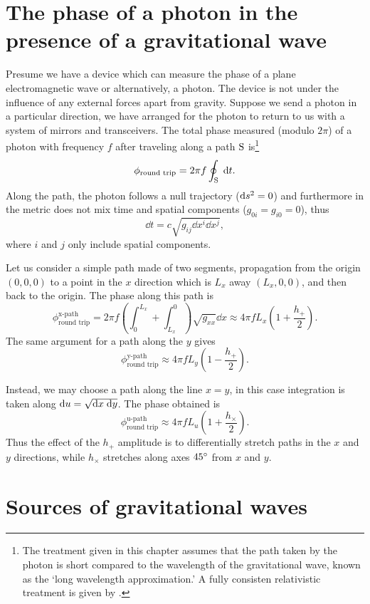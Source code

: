 \section{The phase of a photon in the presence of a gravitational wave}
Presume we have a device which can measure the phase of a plane electromagnetic wave or alternatively, a photon. %
The device is not under the influence of any external forces apart from gravity. %
Suppose we send a photon in a particular direction, we have arranged for the photon to return to us with a system of mirrors and transceivers. %
The total phase measured (modulo $2\pi$) of a photon with frequency $f$ after traveling along a path $\rm S$ is\footnote{The treatment given in this chapter assumes that the path taken by the photon is short compared to the wavelength of the gravitational wave, known as the `long wavelength approximation.' A fully consisten relativistic treatment is given by \citet{RakhmanovPhoton}.}
\begin{equation}
\phi_{\text{round trip}} = 2\pi f\oint_{\rm S} \; \mathrm{d} t.
\end{equation}
Along the path, the photon follows a null trajectory ($\mathrm{d} s^2=0$) and furthermore in  the metric does not mix time and spatial components ($g_{0i}=g_{i0}=0$), thus
\begin{equation}
\dd t = c\sqrt{g_{ij}\dd x^i \dd x^j},
\end{equation}
where $i$ and $j$ only include spatial components.

Let us consider a simple path made of two segments, propagation from the origin $(0,0,0)$ to a point in the $x$ direction which is $L_x$ away $(L_x,0,0)$, and then back to the origin. %
The phase along this path is
\begin{equation}
\phi_{\text{round trip}}^{\text{x-path}}= 2\pi f \left(\int_0^{L_x}+\int^0_{L_x}\right)\sqrt{g_{xx}}\dd x \approx 4\pi f L_x \left(1+\frac{h_+}{2}\right).
\end{equation} 
The same argument for a path along the $y$ gives
\begin{equation}
\phi_{\text{round trip}}^{\text{y-path}} \approx 4\pi f L_y \left(1-\frac{h_+}{2}\right).
\end{equation} 

Instead, we may choose a path along the line $x=y$, in this case integration is taken along $\mathrm{d} u = \sqrt{\mathrm{d} x \; \mathrm{d} y}$. %
The phase obtained is
\begin{equation}
\phi_{\text{round trip}}^{\text{u-path}} \approx 4\pi f L_u \left(1+\frac{h_\times}{2}\right).
\end{equation} 
Thus the effect of the $h_+$ amplitude is to differentially stretch paths in the $x$ and $y$ directions, while $h_\times$ stretches along axes $45 ^\circ$ from $x$ and $y$.
\section{Sources of gravitational waves}

